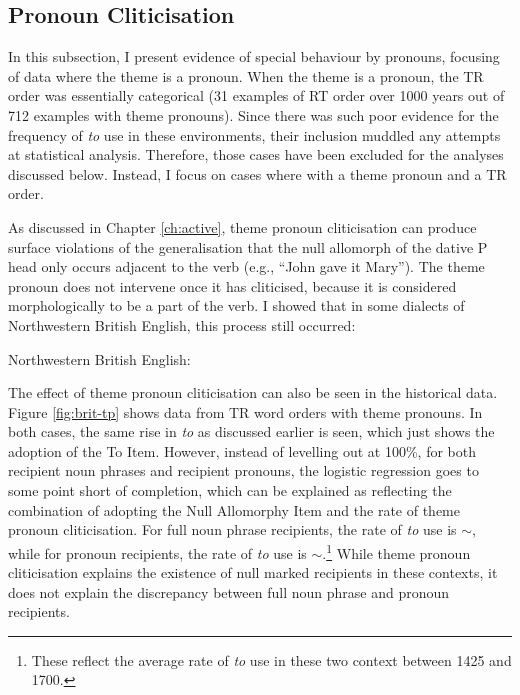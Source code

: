 	\subsection{Pronoun Cliticisation}\label{sec:act-tp}
	In this subsection, I present evidence of special behaviour by pronouns, focusing of data where the theme is a pronoun. When the theme is a pronoun, the TR order was essentially categorical (31 examples of RT order over 1000 years out of 712 examples with theme pronouns). Since there was such poor evidence for the frequency of \textit{to} use in these environments, their inclusion muddled any attempts at statistical analysis. Therefore, those cases have been excluded for the analyses discussed below. Instead, I focus on cases where with a theme pronoun and a TR order.

	As discussed in Chapter \ref{ch:active}, theme pronoun cliticisation can produce surface violations of the generalisation that the null allomorph of the dative P head only occurs adjacent to the verb (e.g., ``John gave it Mary''). The theme pronoun does not intervene once it has cliticised, because it is considered morphologically to be a part of the verb. I showed that in some dialects of Northwestern British English, this process still occurred:

	\begin{exe}
		 Northwestern British English:
		\begin{xlist}
	\end{xlist}
	\end{exe}

	The effect of theme pronoun cliticisation can also be seen in the historical data. Figure \ref{fig:brit-tp} shows data from TR word orders with theme pronouns. In both cases, the same rise in \textit{to} as discussed earlier is seen, which just shows the adoption of the To Item. However, instead of levelling out at 100\%, for both recipient noun phrases and recipient pronouns, the logistic regression goes to some point short of completion, which can be explained as reflecting the combination of adopting the Null Allomorphy Item and the rate of theme pronoun cliticisation. For full noun phrase recipients, the rate of \textit{to} use is $\sim$, while for pronoun recipients, the rate of \textit{to} use is $\sim$.\footnote{These reflect the average rate of \textit{to} use in these two context between 1425 and 1700.} While theme pronoun cliticisation explains the existence of null marked recipients in these contexts, it does not explain the discrepancy between full noun phrase and pronoun recipients.

